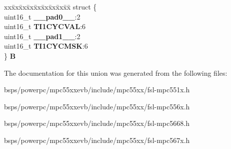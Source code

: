 \begin{DoxyCompactItemize}
\begin{tabbing}
\end{tabbing}\item 
\mbox{\label{unionuTI1CYSR_ad11f1e5857e51af637a3c27dee6844b5}} 
\begin{tabbing}
xx\=xx\=xx\=xx\=xx\=xx\=xx\=xx\=xx\=\kill
struct \{\\
\>uint16\_t {\bfseries \_\_pad0\_\_}:2\\
\>uint16\_t {\bfseries TI1CYCVAL}:6\\
\>uint16\_t {\bfseries \_\_pad1\_\_}:2\\
\>uint16\_t {\bfseries TI1CYCMSK}:6\\
\} {\bfseries B}\\

\end{tabbing}\end{DoxyCompactItemize}


The documentation for this union was generated from the following files\+:\begin{DoxyCompactItemize}
\item 
bsps/powerpc/mpc55xxevb/include/mpc55xx/fsl-\/mpc551x.\+h\item 
bsps/powerpc/mpc55xxevb/include/mpc55xx/fsl-\/mpc556x.\+h\item 
bsps/powerpc/mpc55xxevb/include/mpc55xx/fsl-\/mpc5668.\+h\item 
bsps/powerpc/mpc55xxevb/include/mpc55xx/fsl-\/mpc567x.\+h\end{DoxyCompactItemize}
